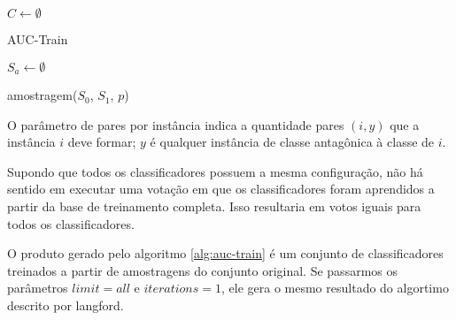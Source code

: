 \begin{algorithm}

    $C \gets \emptyset$



    \caption{AUC-Train}
    \label{alg:auc-train}
\end{algorithm}

\begin{function}

    $S_a \gets \emptyset$\;
    
    


    \caption{amostragem($S_0$, $S_1$, $p$)}
    \label{func:amostra}
\end{function}

O parâmetro de pares por instância indica a quantidade pares $(i, y)$ que a instância $i$ deve formar; $y$ é qualquer instância de classe antagônica à classe de $i$.

Supondo que todos os classificadores possuem a mesma configuração, não há sentido em executar uma votação em que os classificadores foram aprendidos a partir da base de treinamento completa. Isso resultaria em votos iguais para todos os classificadores.

O produto gerado pelo algoritmo \ref{alg:auc-train} é um conjunto de classificadores treinados a partir de amostragens do conjunto original. Se passarmos os parâmetros $limit=all$ e $iterations=1$, ele gera o mesmo resultado do algortimo descrito por {{langford}}.

